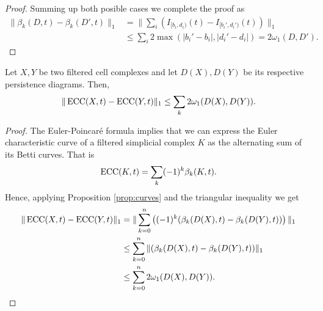 \begin{proof}
    Summing up both posible cases we complete the proof as
    \begin{align}
        \|\beta_k(D, t) - \beta_k(D', t)\|_1 &  = \| \sum_i \left(I_{[b_i, d_i)}(t) - I_{[b_i', d_i')}(t)\right)  \|_1 \\
        &\leq \sum_i 2 \max(|b_i' - b_i|, |d_i' - d_i|) = 2 \omega_1 (D, D').
    \end{align}
\end{proof}

\begin{theorem}
    Let $ X, Y $ be two filtered cell complexes and let $ D(X), D(Y) $ be its respective persistence diagrams. Then,
    \begin{equation}
        \| \operatorname{ECC}(X, t) - \operatorname{ECC}(Y, t) \|_1 \leq \sum_k 2 \omega_1(D(X), D(Y)).
    \end{equation}
\end{theorem}
\begin{proof}
    The Euler-Poincaré formula implies that we can express the Euler characteristic curve of a filtered simplicial complex $K $ as the alternating sum of its Betti curves. That is
    \begin{align}
        \operatorname{ECC}(K, t) = \sum_k(-1)^k \beta_k(K, t).
    \end{align}
    Hence, applying Proposition \ref{prop:curves} and the triangular inequality we get
    \begin{align}
        \| \operatorname{ECC}(X, t) - \operatorname{ECC}(Y, t) \|_1 &= \| \sum_{k=0}^n \left( (-1)^k (\beta_k(D(X), t) - \beta_k(D(Y), t)) \right)\|_1 \\
        &\leq \sum_{k=0}^n \|(\beta_k(D(X), t) - \beta_k(D(Y), t))\|_1 \\
        &\leq \sum_{k=0}^n 2 \omega_1(D(X), D(Y)).    
    \end{align}
\end{proof}
